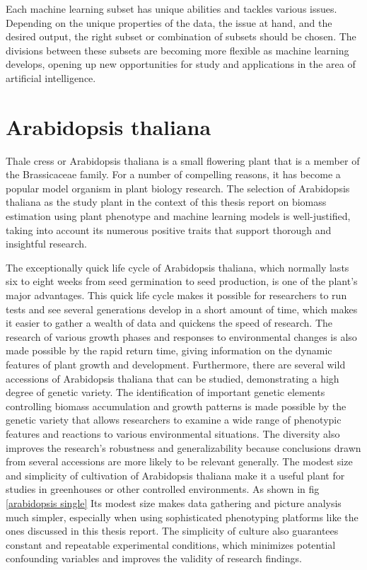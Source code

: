 \documentclass[a4paper,12pt]{report}%
\renewcommand{\\}{\vspace*{0.5\baselineskip} \newline}
\begin{document}
\noindent Each machine learning subset has unique abilities and tackles various issues. Depending on the unique properties of the data, the issue at hand, and the desired output, the right subset or combination of subsets should be chosen. The divisions between these subsets are becoming more flexible as machine learning develops, opening up new opportunities for study and applications in the area of artificial intelligence.




\section{Arabidopsis thaliana}
Thale cress or Arabidopsis thaliana is a small flowering plant that is a member of the Brassicaceae family. For a number of compelling reasons, it has become a popular model organism in plant biology research. The selection of Arabidopsis thaliana as the study plant in the context of this thesis report on biomass estimation using plant phenotype and machine learning models is well-justified, taking into account its numerous positive traits that support thorough and insightful research.

\noindent The exceptionally quick life cycle of Arabidopsis thaliana, which normally lasts six to eight weeks from seed germination to seed production, is one of the plant's major advantages. This quick life cycle makes it possible for researchers to run tests and see several generations develop in a short amount of time, which makes it easier to gather a wealth of data and quickens the speed of research. The research of various growth phases and responses to environmental changes is also made possible by the rapid return time, giving information on the dynamic features of plant growth and development.
Furthermore, there are several wild accessions of Arabidopsis thaliana that can be studied, demonstrating a high degree of genetic variety. The identification of important genetic elements controlling biomass accumulation and growth patterns is made possible by the genetic variety that allows researchers to examine a wide range of phenotypic features and reactions to various environmental situations. The diversity also improves the research's robustness and generalizability because conclusions drawn from several accessions are more likely to be relevant generally.
The modest size and simplicity of cultivation of Arabidopsis thaliana make it a useful plant for studies in greenhouses or other controlled environments. As shown in fig \ref{arabidopsis single} Its modest size makes data gathering and picture analysis much simpler, especially when using sophisticated phenotyping platforms like the ones discussed in this thesis report. The simplicity of culture also guarantees constant and repeatable experimental conditions, which minimizes potential confounding variables and improves the validity of research findings.
\end{document}
